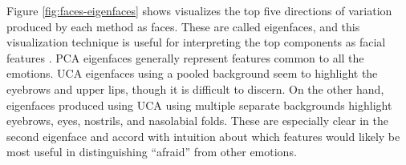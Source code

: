 \documentclass[12pt]{article}
\begin{document}
Figure \ref{fig:faces-eigenfaces} shows visualizes the top five directions of variation produced by each method as faces. These are called eigenfaces, and this visualization technique is useful for interpreting the top components as facial features \cite{turk1991eigenfaces}. PCA eigenfaces generally represent features common to all the emotions. UCA eigenfaces using a pooled background seem to highlight the eyebrows and upper lips, though it is difficult to discern. On the other hand, eigenfaces produced using UCA using multiple separate backgrounds highlight eyebrows, eyes, nostrils, and nasolabial folds. These are especially clear in the second eigenface and accord with intuition about which features would likely be most useful in distinguishing ``afraid'' from other emotions.







\end{document}
